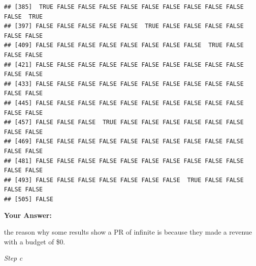\documentclass[
]{article}
\newenvironment{Shaded}{\begin{snugshade}}{\end{snugshade}}
\newcommand{\FunctionTok}[1]{\textcolor[rgb]{0.13,0.29,0.53}{\textbf{#1}}}
\newcommand{\NormalTok}[1]{#1}
\newcommand{\SpecialCharTok}[1]{\textcolor[rgb]{0.81,0.36,0.00}{\textbf{#1}}}
\begin{document}
\begin{verbatim}
## [385]  TRUE FALSE FALSE FALSE FALSE FALSE FALSE FALSE FALSE FALSE FALSE  TRUE
## [397] FALSE FALSE FALSE FALSE FALSE  TRUE FALSE FALSE FALSE FALSE FALSE FALSE
## [409] FALSE FALSE FALSE FALSE FALSE FALSE FALSE FALSE  TRUE FALSE FALSE FALSE
## [421] FALSE FALSE FALSE FALSE FALSE FALSE FALSE FALSE FALSE FALSE FALSE FALSE
## [433] FALSE FALSE FALSE FALSE FALSE FALSE FALSE FALSE FALSE FALSE FALSE FALSE
## [445] FALSE FALSE FALSE FALSE FALSE FALSE FALSE FALSE FALSE FALSE FALSE FALSE
## [457] FALSE FALSE FALSE  TRUE FALSE FALSE FALSE FALSE FALSE FALSE FALSE FALSE
## [469] FALSE FALSE FALSE FALSE FALSE FALSE FALSE FALSE FALSE FALSE FALSE FALSE
## [481] FALSE FALSE FALSE FALSE FALSE FALSE FALSE FALSE FALSE FALSE FALSE FALSE
## [493] FALSE FALSE FALSE FALSE FALSE FALSE FALSE  TRUE FALSE FALSE FALSE FALSE
## [505] FALSE
\end{verbatim}

\textbf{Your Answer:}

the reason why some results show a PR of infinite is because they made a
revenue with a budget of \$0.

\emph{Step c}

\begin{Shaded}
\end{Shaded}
\end{document}

